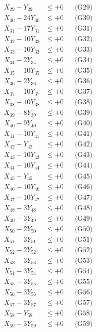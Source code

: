 \documentclass[a4paper,10pt]{article}
\begin{document}
{\begin{align}
X_{29} - Y_{29} &\leq +0 && \text{(G29)} \\
X_{30} - 24Y_{30} &\leq +0 && \text{(G30)} \\
X_{31} - 17Y_{31} &\leq +0 && \text{(G31)} \\
X_{32} - 10Y_{32} &\leq +0 && \text{(G32)} \\
X_{33} - 10Y_{33} &\leq +0 && \text{(G33)} \\
X_{34} - 2Y_{34} &\leq +0 && \text{(G34)} \\
X_{35} - 10Y_{35} &\leq +0 && \text{(G35)} \\
X_{36} - 2Y_{36} &\leq +0 && \text{(G36)} \\
X_{37} - 10Y_{37} &\leq +0 && \text{(G37)} \\
\allowbreak
X_{38} - 10Y_{38} &\leq +0 && \text{(G38)} \\
X_{39} - 8Y_{39} &\leq +0 && \text{(G39)} \\
X_{40} - 9Y_{40} &\leq +0 && \text{(G40)} \\
X_{41} - 10Y_{41} &\leq +0 && \text{(G41)} \\
X_{42} - Y_{42} &\leq +0 && \text{(G42)} \\
X_{43} - 10Y_{43} &\leq +0 && \text{(G43)} \\
X_{44} - 10Y_{44} &\leq +0 && \text{(G44)} \\
X_{45} - Y_{45} &\leq +0 && \text{(G45)} \\
X_{46} - 10Y_{46} &\leq +0 && \text{(G46)} \\
X_{47} - 10Y_{47} &\leq +0 && \text{(G47)} \\
\allowbreak
X_{48} - 3Y_{48} &\leq +0 && \text{(G48)} \\
X_{49} - 3Y_{49} &\leq +0 && \text{(G49)} \\
X_{50} - 2Y_{50} &\leq +0 && \text{(G50)} \\
X_{51} - 3Y_{51} &\leq +0 && \text{(G51)} \\
X_{52} - 2Y_{52} &\leq +0 && \text{(G52)} \\
X_{53} - 3Y_{53} &\leq +0 && \text{(G53)} \\
X_{54} - 3Y_{54} &\leq +0 && \text{(G54)} \\
X_{55} - 3Y_{55} &\leq +0 && \text{(G55)} \\
X_{56} - 3Y_{56} &\leq +0 && \text{(G56)} \\
X_{57} - 3Y_{57} &\leq +0 && \text{(G57)} \\
\allowbreak
X_{58} - Y_{58} &\leq +0 && \text{(G58)} \\
X_{59} - 3Y_{59} &\leq +0 && \text{(G59)} \\

\end{align}}
\end{document}
